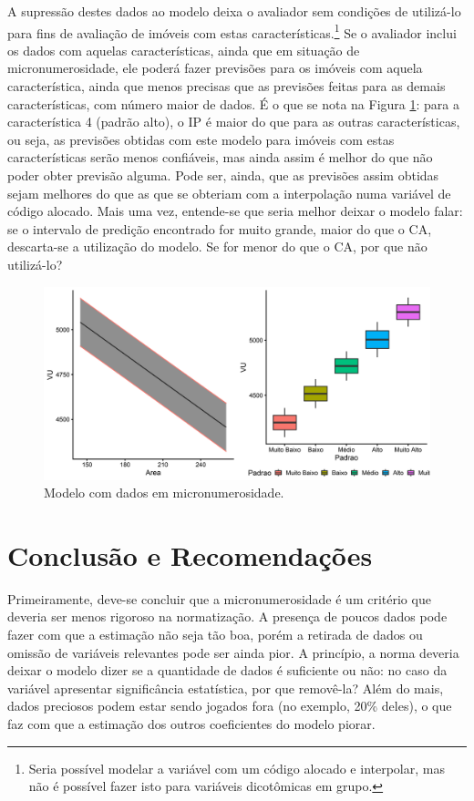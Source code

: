 \documentclass[
  a4paper, 11pt]{article}
\begin{document}
A supressão destes dados ao modelo deixa o avaliador sem condições de
utilizá-lo para fins de avaliação de imóveis com estas
características.\footnote{Seria possível modelar a variável com um
  código alocado e interpolar, mas não é possível fazer isto para
  variáveis dicotômicas em grupo.} Se o avaliador inclui os dados com
aquelas características, ainda que em situação de micronumerosidade, ele
poderá fazer previsões para os imóveis com aquela característica, ainda
que menos precisas que as previsões feitas para as demais
características, com número maior de dados. É o que se nota na Figura
\ref{fig:modelo1}: para a característica 4 (padrão alto), o IP é maior
do que para as outras características, ou seja, as previsões obtidas com
este modelo para imóveis com estas características serão menos
confiáveis, mas ainda assim é melhor do que não poder obter previsão
alguma. Pode ser, ainda, que as previsões assim obtidas sejam melhores
do que as que se obteriam com a interpolação numa variável de código
alocado. Mais uma vez, entende-se que seria melhor deixar o modelo
falar: se o intervalo de predição encontrado for muito grande, maior do
que o CA, descarta-se a utilização do modelo. Se for menor do que o CA,
por que não utilizá-lo?

\begin{figure}[H]

{\centering \includegraphics[width=0.7\linewidth]{images/modelo1-1} 

}

\caption{Modelo com dados em micronumerosidade.}\label{fig:modelo1}
\end{figure}

\hypertarget{conclusuxe3o-e-recomendauxe7uxf5es}{%
\section{Conclusão e
Recomendações}\label{conclusuxe3o-e-recomendauxe7uxf5es}}

Primeiramente, deve-se concluir que a micronumerosidade é um critério
que deveria ser menos rigoroso na normatização. A presença de poucos
dados pode fazer com que a estimação não seja tão boa, porém a retirada
de dados ou omissão de variáveis relevantes pode ser ainda pior. A
princípio, a norma deveria deixar o modelo dizer se a quantidade de
dados é suficiente ou não: no caso da variável apresentar significância
estatística, por que removê-la? Além do mais, dados preciosos podem
estar sendo jogados fora (no exemplo, 20\% deles), o que faz com que a
estimação dos outros coeficientes do modelo piorar.
\end{document}
